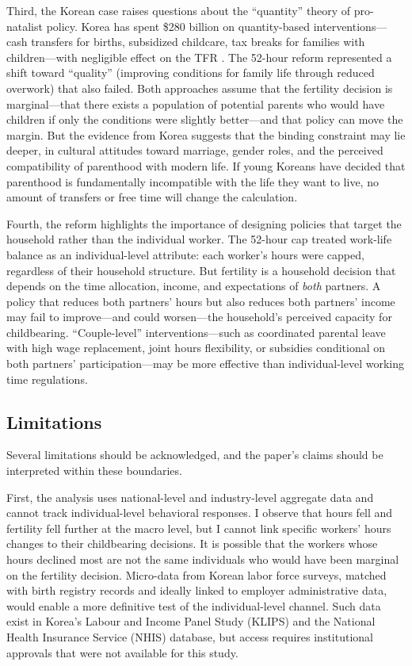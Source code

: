 \documentclass[12pt]{article}
\begin{document}
Third, the Korean case raises questions about the ``quantity'' theory of pro-natalist policy. Korea has spent \$280 billion on quantity-based interventions---cash transfers for births, subsidized childcare, tax breaks for families with children---with negligible effect on the TFR \citep{yoo2022spending}. The 52-hour reform represented a shift toward ``quality'' (improving conditions for family life through reduced overwork) that also failed. Both approaches assume that the fertility decision is marginal---that there exists a population of potential parents who would have children if only the conditions were slightly better---and that policy can move the margin. But the evidence from Korea suggests that the binding constraint may lie deeper, in cultural attitudes toward marriage, gender roles, and the perceived compatibility of parenthood with modern life. If young Koreans have decided that parenthood is fundamentally incompatible with the life they want to live, no amount of transfers or free time will change the calculation.

Fourth, the reform highlights the importance of designing policies that target the household rather than the individual worker. The 52-hour cap treated work-life balance as an individual-level attribute: each worker's hours were capped, regardless of their household structure. But fertility is a household decision that depends on the time allocation, income, and expectations of \textit{both} partners. A policy that reduces both partners' hours but also reduces both partners' income may fail to improve---and could worsen---the household's perceived capacity for childbearing. ``Couple-level'' interventions---such as coordinated parental leave with high wage replacement, joint hours flexibility, or subsidies conditional on both partners' participation---may be more effective than individual-level working time regulations.

\subsection{Limitations}

Several limitations should be acknowledged, and the paper's claims should be interpreted within these boundaries.

First, the analysis uses national-level and industry-level aggregate data and cannot track individual-level behavioral responses. I observe that hours fell and fertility fell further at the macro level, but I cannot link specific workers' hours changes to their childbearing decisions. It is possible that the workers whose hours declined most are not the same individuals who would have been marginal on the fertility decision. Micro-data from Korean labor force surveys, matched with birth registry records and ideally linked to employer administrative data, would enable a more definitive test of the individual-level channel. Such data exist in Korea's Labour and Income Panel Study (KLIPS) and the National Health Insurance Service (NHIS) database, but access requires institutional approvals that were not available for this study.
\end{document}
